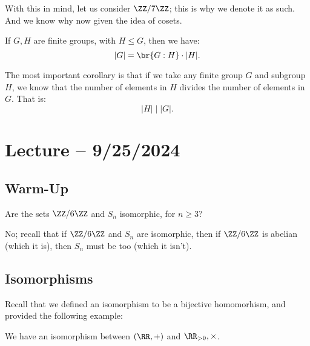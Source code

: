 \documentclass[openany]{book}
\begin{document}
\begin{example}
	With this in mind, let us consider $\ZZ/7\ZZ$; this is why we denote it as such. And we know why now given the idea of cosets.
\end{example}

\begin{thm}
	If $G, H$ are finite groups, with $H \leq G$, then we have:
	\begin{equation*}
		\lvert G \rvert = \br{G:H} \cdot \lvert H \rvert.
	\end{equation*}
\end{thm}

\begin{cor}
	The most important corollary is that if we take any finite group $G$ and subgroup $H$, we know that the number of elements in $H$ divides the number of elements in $G$. That is:
	\begin{equation*}
		\lvert H \rvert \mid \lvert G \rvert.
	\end{equation*}
\end{cor}

\section{Lecture -- 9/25/2024}
\subsection{Warm-Up}
\begin{hw}
	Are the sets $\ZZ/6\ZZ$ and $S_n$ isomorphic, for $n \geq 3$?
\end{hw}
\begin{solution}
	No; recall that if $\ZZ/6\ZZ$ and $S_n$ are isomorphic, then if $\ZZ/6\ZZ$ is abelian (which it is), then $S_n$ must be too (which it isn't).
\end{solution}

\subsection{Isomorphisms}
Recall that we defined an isomorphism to be a bijective homomorhism, and provided the following example:
\begin{example}
	We have an isomorphism between $(\RR, +)$ and $\RR_{>0}, \times$.
\end{example}
\end{document}
